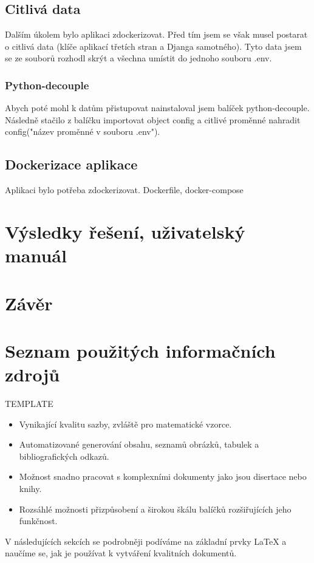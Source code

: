 \documentclass[12pt, a4paper,
twoside,        %
openright
]{report}
\begin{document}
\section{Citlivá data}
\label{sec:citlivadata}
Dalším úkolem bylo aplikaci zdockerizovat. Před tím jsem se však musel postarat o citlivá data (klíče aplikací třetích stran a Djanga samotného). Tyto data jsem se ze souborů rozhodl skrýt a všechna umístit do jednoho souboru .env.

\subsection{Python-decouple}
Abych poté mohl k datům přistupovat nainstaloval jsem balíček python-decouple. Následně stačilo z balíčku importovat object config a citlivé proměnné nahradit config("název proměnné v souboru .env").

\section{Dockerizace aplikace}
\label{sec:dockerizaceaplikace}
Aplikaci bylo potřeba zdockerizovat. Dockerfile, docker-compose

\chapter{Výsledky řešení, uživatelský manuál}

\chapter{Závěr}

\chapter{Seznam použitých informačních zdrojů}
TEMPLATE
\begin{itemize}
	\item Vynikající kvalitu sazby, zvláště pro matematické vzorce.
	\item Automatizované generování obsahu, seznamů obrázků, tabulek a bibliografických odkazů.
	\item Možnost snadno pracovat s komplexními dokumenty jako jsou disertace nebo knihy.
	\item Rozsáhlé možnosti přizpůsobení a širokou škálu balíčků rozšiřujících jeho funkčnost.
\end{itemize}

V následujících sekcích se podrobněji podíváme na základní prvky \LaTeX{} a naučíme se, jak je používat k vytváření kvalitních dokumentů.
\end{document}
